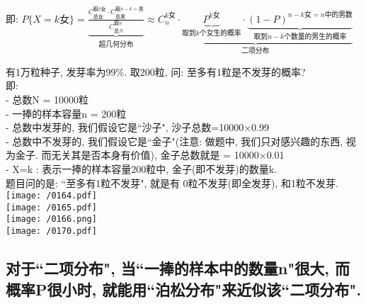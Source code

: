 \documentclass[UTF8]{ctexart}
\begin{document}
	即: $
	P\{X=k\text{女\}}=\underset{\text{超几何分布}}{\underbrace{\frac{C_{\text{总女}}^{\text{取}k\text{女}}\cdot C_{\text{总男}}^{\text{取}n-k=\text{男}}}{C_{\text{总}N}^{\text{取}n}}}}\approx \underset{\text{二项分布}}{\underbrace{C_{n}^{k\text{女}}\cdot \underset{\text{取到}k\text{个女生的概率}}{\underbrace{P^{k\text{女}}}}\cdot \underset{\text{取到}n-k\text{个数量的男生的概率}}{\underbrace{(1-P)^{n-k\text{女}=n\text{中的男数}}}}}}
	$	 \\
	
	
	\begin{myEnvSample}
		有1万粒种子, 发芽率为99\%. 取200粒, 问: 至多有1粒是不发芽的概率? \\
		即: \\
		- 总数N = 10000粒 \\
		- 一捧的样本容量n = 200粒 \\
		- 总数中发芽的, 我们假设它是``沙子", 沙子总数=10000×0.99 \\
		- 总数中不发芽的, 我们假设它是``金子"(注意: 做题中, 我们只对感兴趣的东西, 视为金子. 而无关其是否本身有价值), 金子总数就是 = 10000×0.01 \\
		- X=k : 表示一捧的样本容量200粒中, 金子(即不发芽)的数量k. \\
		
		题目问的是: ``至多有1粒不发芽", 就是有 0粒不发芽(即全发芽), 和1粒不发芽. \\
		
		\texttt{[image: /0164.pdf]} \\
		
		\texttt{[image: /0165.pdf]} \\
		
		\texttt{[image: /0166.png]} \\
		
		\texttt{[image: /0170.pdf]}
		
	\end{myEnvSample}



	
	\subsection{对于``二项分布", 当``一捧的样本中的数量n"很大, 而概率P很小时, 就能用``泊松分布"来近似该``二项分布".}
	
\end{document}
